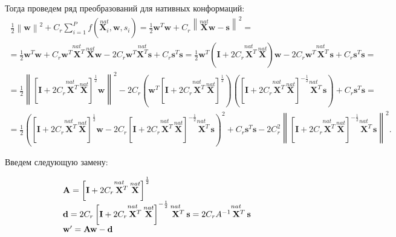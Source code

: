 \documentclass[CEJM,PDF]{Class+Reg_in_Molec_Docking} %
\begin{document}
Тогда проведем ряд преобразований для нативных конформаций:
\begin{multline*}
\; \frac{1}{2}\left\|\mathbf{w}\right\|^2 + C_r\sum_{i=1}^{P} f\left(\overset{nat}{\mathbf{X}_i},\mathbf{w},s_i\right) = \frac{1}{2}\mathbf{w}^T\mathbf{w} + C_r \left\| \overset{nat}{\mathbf{X}}\mathbf{w}-\mathbf{s} \right\|^2 =\\
= \frac{1}{2}\mathbf{w}^T\mathbf{w} + C_r \mathbf{w}^T\overset{nat\;\;\;}{\mathbf{X}^T}\overset{nat}{\mathbf{X}}\mathbf{w} - 2C_r\mathbf{w}^T\overset{nat}{\mathbf{X}^T}\mathbf{s} + C_r\mathbf{s}^T\mathbf{s} =  \frac{1}{2}\mathbf{w}^T\left( \mathbf{I} + 2C_r\overset{nat\;\;\;}{\mathbf{X}^T}\overset{nat}{\mathbf{X}} \right)\mathbf{w} - 2C_r\mathbf{w}^T\overset{nat\;\;\;}{\mathbf{X}^T}\mathbf{s} + C_r\mathbf{s}^T\mathbf{s} =\\
 = \frac{1}{2}\left\|\left[ \mathbf{I} + 2C_r\overset{nat\;\;\;}{\mathbf{X}^T}\overset{nat}{\mathbf{X}} \right]^{\frac{1}{2}}\mathbf{w}\right\|^2 - 2C_r\left(\mathbf{w}^T\left[ \mathbf{I} + 2C_r\overset{nat\;\;\;}{\mathbf{X}^T}\overset{nat}{\mathbf{X}} \right]^{\frac{1}{2}}\right)\left(\left[ \mathbf{I} + 2C_r\overset{nat\;\;\;}{\mathbf{X}^T}\overset{nat}{\mathbf{X}} \right]^{-\frac{1}{2}}\overset{nat\;\;\;}{\mathbf{X}^T}\mathbf{s}\right) + C_r\mathbf{s}^T\mathbf{s} = \\
 = \frac{1}{2}\left( \left[ \mathbf{I} + 2C_r\overset{nat\;\;\;}{\mathbf{X}^T}\overset{nat}{\mathbf{X}} \right]^{\frac{1}{2}}\mathbf{w} - 2C_r \left[ \mathbf{I} + 2C_r\overset{nat\;\;\;}{\mathbf{X}^T}\overset{nat}{\mathbf{X}} \right]^{-\frac{1}{2}}\overset{nat\;\;\;}{\mathbf{X}^T}\mathbf{s}  \right)^2 + C_r\mathbf{s}^T\mathbf{s} - 2C_r^2\left\| \left[ \mathbf{I} + 2C_r\overset{nat\;\;\;}{\mathbf{X}^T}\overset{nat}{\mathbf{X}} \right]^{-\frac{1}{2}}\overset{nat\;\;\;}{\mathbf{X}^T}\mathbf{s}\right\|^2.
\end{multline*}

Введем следующую замену:

\begin{eqnarray}\label{transform} 
\begin{tabular}{lc}
$\mathbf{A} = \left[ \mathbf{I} + 2C_r\overset{nat\;\;\;}{\mathbf{X}^T}\overset{nat}{\mathbf{X}} \right]^{\frac{1}{2}}$\\
$\mathbf{d} = 2C_r\left[ \mathbf{I} + 2C_r\overset{nat\;\;\;}{\mathbf{X}^T}\overset{nat}{\mathbf{X}} \right]^{-\frac{1}{2}}\overset{nat\;\;\;}{\mathbf{X}^T}\mathbf{s} = 2C_rA^{-1}\overset{nat\;\;\;}{\mathbf{X}^T}\mathbf{s}$\\
$\mathbf{w'} = \mathbf{Aw - d}$
\end{tabular}
\end{eqnarray}
\end{document}

